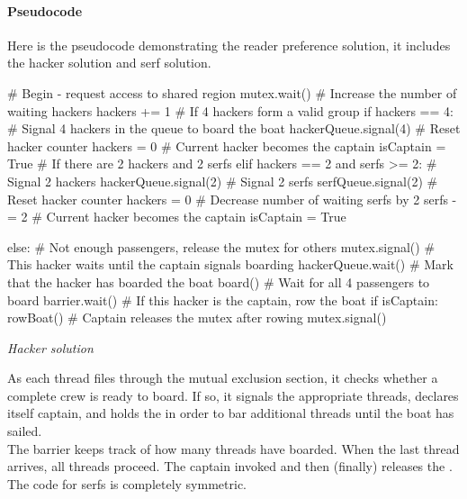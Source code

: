 \documentclass[a4paper, 10pt]{article}
\begin{document}
\paragraph{Pseudocode} Here is the pseudocode demonstrating the reader preference solution, it includes the hacker solution and serf solution.
\begin{mycodeblock}
# Begin - request access to shared region
mutex.wait() 
# Increase the number of waiting hackers
     hackers += 1 
# If 4 hackers form a valid group
     if hackers == 4:
# Signal 4 hackers in the queue to board the boat
         hackerQueue.signal(4)        
# Reset hacker counter
         hackers = 0                  
# Current hacker becomes the captain
         isCaptain = True              
# If there are 2 hackers and 2 serfs
     elif hackers == 2 and serfs >= 2:
# Signal 2 hackers
         hackerQueue.signal(2)        
# Signal 2 serfs
         serfQueue.signal(2)          
# Reset hacker counter
         hackers = 0   
# Decrease number of waiting serfs by 2
         serfs -= 2   
# Current hacker becomes the captain
         isCaptain = True             

     else:
# Not enough passengers, release the mutex for others
         mutex.signal()              
# This hacker waits until the captain signals boarding
hackerQueue.wait()                
# Mark that the hacker has boarded the boat
board()                          
# Wait for all 4 passengers to board
barrier.wait()                    
# If this hacker is the captain, row the boat
if isCaptain:                     
    rowBoat()
# Captain releases the mutex after rowing
    mutex.signal()                
\end{mycodeblock}
\begin{center}
    \textit{Hacker solution}
\end{center}
As each thread files through the mutual exclusion section, it checks whether
a complete crew is ready to board. If so, it signals the appropriate threads,
declares itself captain, and holds the {} in order to bar additional threads
until the boat has sailed.\\
The barrier keeps track of how many threads have boarded. When the last
thread arrives, all threads proceed. The captain invoked {} and then (finally)
releases the {}.\\
The code for serfs is completely symmetric. 
\end{document}
